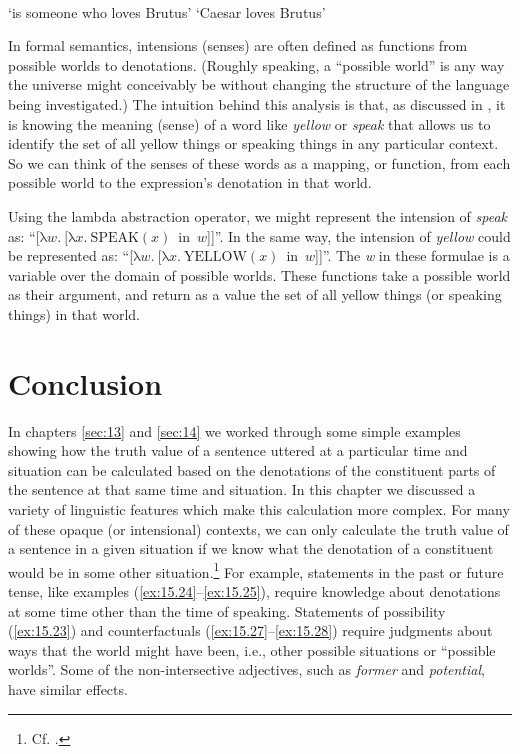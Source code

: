 \ea \label{ex:15.40}
\\
\hfill  ‘is someone who loves Brutus’
 \hfill ‘Caesar loves Brutus’
\z \z


In formal semantics, intensions (senses) are often defined as functions from possible worlds to denotations. (Roughly speaking, a “possible world” is any way the universe might conceivably be without changing the structure of the language being investigated.) The intuition behind this analysis is that, as discussed in , it is knowing the meaning (sense) of a word like \textit{yellow} or \textit{speak} that allows us to identify the set of all yellow things or speaking things in any particular context. So we can think of the senses of these words as a mapping, or function, from each possible world to the expression’s denotation in that world.



Using the lambda abstraction operator, we might represent the intension of \textit{speak} as: “[$\text{λ}w.~[\text{λ}x.~\text{SPEAK}(x)$~in~$w$]]”. In the same way, the intension of \textit{yellow} could be represented as: “[$\text{λ}w.~[\text{λ}x.~\text{YELLOW}(x)$~in~$w$]]”. The \textit{w} in these formulae is a variable over the domain of possible worlds. These functions take a possible world as their argument, and return as a value the set of all yellow things (or speaking things) in that world.


\section{Conclusion}\label{sec:15.7}
In chapters \ref{sec:13} and \ref{sec:14} we worked through some simple examples showing how the truth value of a sentence uttered at a particular time and situation can be calculated based on the denotations of the constituent parts of the sentence at that same time and situation. In this chapter we discussed a variety of linguistic features which make this calculation more complex. For many of these opaque (or intensional) contexts, we can only calculate the truth value of a sentence in a given situation if we know what the denotation of a constituent would be in some other situation.\footnote{Cf. \citet[204–208]{ChierchiaMcConnell-Ginet1990}.} For example, statements in the past or future tense, like examples (\ref{ex:15.24}--\ref{ex:15.25}), require knowledge about denotations at some time other than the time of speaking. Statements of possibility (\ref{ex:15.23}) and counterfactuals (\ref{ex:15.27}--\ref{ex:15.28}) require judgments about ways that the world might have been, i.e., other possible situations or “possible worlds”. Some of the non-intersective adjectives, such as \textit{former} and \textit{potential}, have similar effects.



